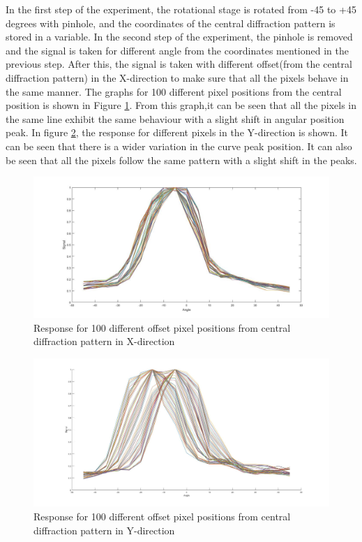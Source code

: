 In the first step of the experiment, the rotational stage is rotated from -45 to +45 degrees with pinhole, and the coordinates of the central diffraction pattern is stored in a variable. In the second step of the experiment, the pinhole is removed and the signal is taken for different angle from the coordinates mentioned in the previous step. After this, the signal is taken with different offset(from the central diffraction pattern) in the X-direction to make sure that all the pixels behave in the same manner. The graphs for 100 different pixel positions from the central position is shown in Figure \ref{fig:offset_calib}. From this graph,it can be seen that all the pixels in the same line exhibit the same behaviour with a slight shift in angular position peak. In figure \ref{fig:offset_calibY}, the response for different pixels in the Y-direction is shown. It can  be seen that there is a wider variation in the curve peak position. It can also be seen that all the pixels follow the same pattern with a slight shift in the peaks.
\begin{figure}[!h]
\centering
\includegraphics[scale=0.2125]{pics/ResponseOffset.jpg}
\caption{Response for 100 different offset pixel positions from central diffraction pattern in X-direction}
\label{fig:offset_calib}
\end{figure}

\begin{figure}[!h]
\centering
\includegraphics[scale=0.150]{pics/ResponseYOffset.jpg}
\caption{Response for 100 different offset pixel positions from central diffraction pattern in Y-direction}
\label{fig:offset_calibY}
\end{figure}

